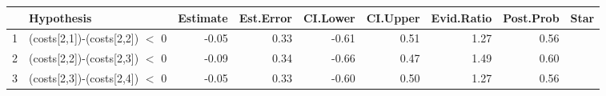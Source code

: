 \begin{table}[ht]
\centering
\begin{tabular}{rlrrrrrrl}
  \hline
 & Hypothesis & Estimate & Est.Error & CI.Lower & CI.Upper & Evid.Ratio & Post.Prob & Star \\ 
  \hline
1 & (costs[2,1])-(costs[2,2]) $<$ 0 & -0.05 & 0.33 & -0.61 & 0.51 & 1.27 & 0.56 &  \\ 
  2 & (costs[2,2])-(costs[2,3]) $<$ 0 & -0.09 & 0.34 & -0.66 & 0.47 & 1.49 & 0.60 &  \\ 
  3 & (costs[2,3])-(costs[2,4]) $<$ 0 & -0.05 & 0.33 & -0.60 & 0.50 & 1.27 & 0.56 &  \\ 
   \hline
\end{tabular}
\end{table}
